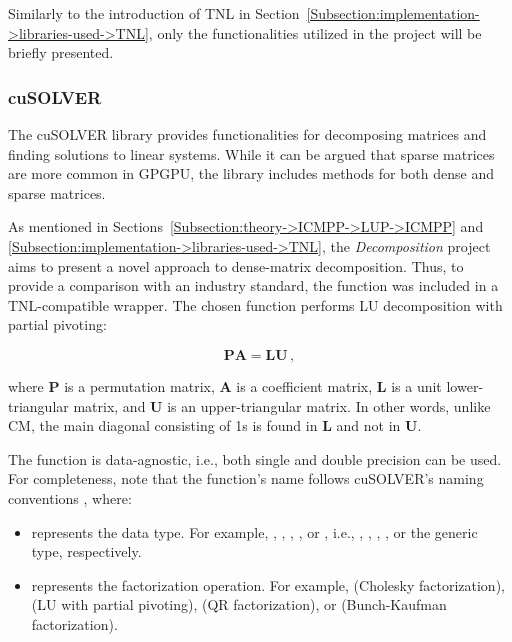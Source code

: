 Similarly to the introduction of TNL in Section~\ref{Subsection:implementation->libraries-used->TNL}, only the functionalities utilized in the project will be briefly presented.

\subsubsection{cuSOLVER}\label{Subsection:implementation->libraries-used->CUDA-libraries->cuSOLVER}
The cuSOLVER library provides functionalities for decomposing matrices and finding solutions to linear systems. While it can be argued that sparse matrices are more common in GPGPU, the library includes methods for both dense and sparse matrices.

As mentioned in Sections~\ref{Subsection:theory->ICMPP->LUP->ICMPP} and \ref{Subsection:implementation->libraries-used->TNL}, the \textit{Decomposition} project aims to present a novel approach to dense-matrix decomposition. Thus, to provide a comparison with an industry standard, the  function was included in a TNL-compatible wrapper. The chosen function performs LU decomposition with partial pivoting:

\begin{equation}
	\mathbf{PA} = \mathbf{LU} \,,
\end{equation}

where $\mathbf{P}$ is a permutation matrix, $\mathbf{A}$ is a coefficient matrix, $\mathbf{L}$ is a unit lower-triangular matrix, and $\mathbf{U}$ is an upper-triangular matrix. In other words, unlike CM, the main diagonal consisting of 1s is found in $\mathbf{L}$ and not in $\mathbf{U}$.

The function is data-agnostic, i.e., both single and double precision can be used. For completeness, note that the function's name follows cuSOLVER's naming conventions  \cite{5D33zKi5iStCty0r}, where:

\begin{itemize}
	\item {} represents the data type. For example, , , , , or , i.e., , , , , or the generic type, respectively.
	\item {} represents the factorization operation. For example,  (Cholesky factorization),  (LU with partial pivoting),  (QR factorization), or  (Bunch-Kaufman factorization).
\end{itemize}

